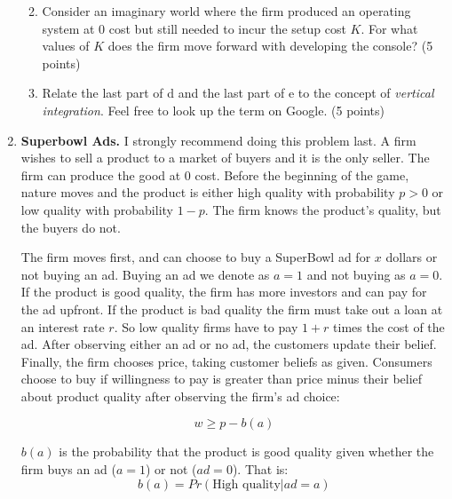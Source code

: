 \documentclass{article}
\begin{document}
\begin{enumerate}
\begin{enumerate}
         \vspace{4cm}
          
          \pagebreak
          
        \item Consider an imaginary world where the firm produced an operating system at 0 cost but still needed to incur the setup cost $K$. For what values of $K$ does the firm move forward with developing the console? (5 points)
        
       \vspace{6cm}
        
        
        \item Relate the last part of d and the last part of e to the concept of \textit{vertical integration}. Feel free to look up the term on Google. (5 points)
          
       \vspace{4cm}
       
      \end{enumerate}

        \item \textbf{Superbowl Ads.} I strongly recommend doing this problem last. A firm wishes to sell a product to a market of buyers and it is the only seller. The firm can produce the good at 0 cost. Before the beginning of the game, nature moves and the product is either high quality with probability $p>0$ or low quality with probability $1-p$. The firm knows the product's quality, but the buyers do not.
      
      The firm moves first, and can choose to buy a SuperBowl ad for $x$ dollars or not buying an ad. Buying an ad we denote as $a=1$ and not buying as $a=0$. If the product is good quality, the firm has more investors and can pay for the ad upfront. If the product is bad quality the firm must take out a loan at an interest rate $r$. So low quality firms have to pay $1+r$ times the cost of the ad. After observing either an ad or no ad, the customers update their belief. Finally, the firm chooses price, taking customer beliefs as given. Consumers choose to buy if willingness to pay is greater than price minus their belief about product quality after observing the firm's ad choice:
      
      \[w\geq p-b(a) \]
      
       $b(a)$ is the probability that the product is good quality given whether the firm buys an ad ($a=1$) or not ($ad=0$).  That is:
       \[b(a) = Pr(\text{High quality} | ad = a)\]
       

\end{enumerate}
\end{document}
